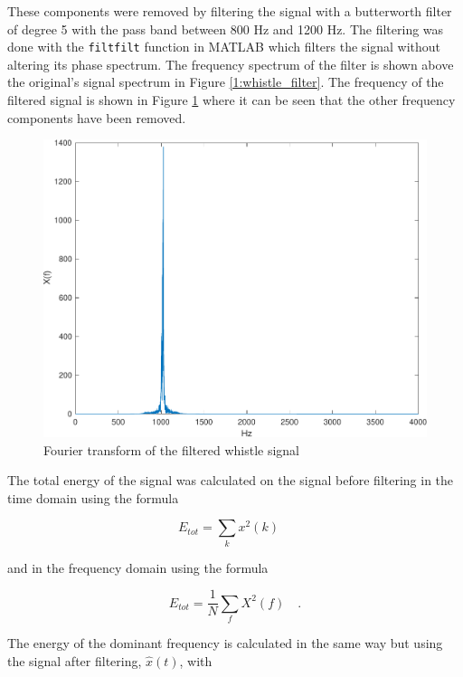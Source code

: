 \documentclass{IEEEtran}
\newcommand{\code}[1]{\texttt{#1}}
\begin{document}
These components were removed by filtering the signal with a butterworth
filter of degree 5 with the pass band between 800 Hz and 1200 Hz. The
filtering was done with the \code{filtfilt} function in MATLAB which filters
the signal without altering its phase spectrum. The frequency spectrum
of the filter is shown above the original's signal spectrum in Figure
\ref{1:whistle_filter}. The frequency of the filtered signal is shown
in Figure \ref{1:whistle_clean} where it can be seen that the other
frequency components have been removed.

\begin{figure}[h]
  \centering
  \captionsetup{justification=centering}

  \includegraphics[width=0.8\columnwidth]{pictures/whistle_clean.pdf}
  \caption{Fourier transform of the filtered whistle signal}
  \label{1:whistle_clean}

\end{figure}

The total energy of the signal was calculated on the signal before filtering
in the time domain using the formula

\begin{equation}
  E_{tot} = \sum_k{x^2(k)} \quad
\end{equation}

and in the frequency domain using the formula

\begin{equation}
  E_{tot} = \frac{1}{N}\sum_f{X^2(f)} \quad .
\end{equation}

The energy of the dominant frequency is calculated in the same way but
using the signal after filtering, $\hat{x}(t)$, with
\end{document}
